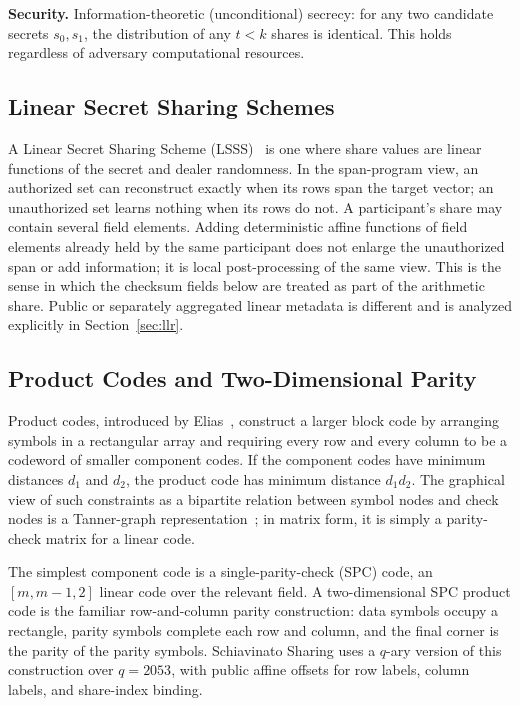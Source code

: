 \documentclass[11pt]{article}
\begin{document}
\textbf{Security.} Information-theoretic (unconditional) secrecy: for any two candidate secrets $s_0, s_1$, the distribution of any $t < k$ shares is identical. This holds regardless of adversary computational resources.

\subsection{Linear Secret Sharing Schemes}

A Linear Secret Sharing Scheme (LSSS)~\cite{beimel2011} is one where share values are linear functions of the secret and dealer randomness. In the span-program view, an authorized set can reconstruct exactly when its rows span the target vector; an unauthorized set learns nothing when its rows do not. A participant's share may contain several field elements. Adding deterministic affine functions of field elements already held by the same participant does not enlarge the unauthorized span or add information; it is local post-processing of the same view. This is the sense in which the checksum fields below are treated as part of the arithmetic share. Public or separately aggregated linear metadata is different and is analyzed explicitly in Section~\ref{sec:llr}.

\subsection{Product Codes and Two-Dimensional Parity}

Product codes, introduced by Elias~\cite{elias1954}, construct a larger block code by arranging symbols in a rectangular array and requiring every row and every column to be a codeword of smaller component codes. If the component codes have minimum distances $d_1$ and $d_2$, the product code has minimum distance $d_1 d_2$. The graphical view of such constraints as a bipartite relation between symbol nodes and check nodes is a Tanner-graph representation~\cite{tanner1981}; in matrix form, it is simply a parity-check matrix for a linear code.

The simplest component code is a single-parity-check (SPC) code, an $[m,m{-}1,2]$ linear code over the relevant field. A two-dimensional SPC product code is the familiar row-and-column parity construction: data symbols occupy a rectangle, parity symbols complete each row and column, and the final corner is the parity of the parity symbols. Schiavinato Sharing uses a $q$-ary version of this construction over $q=2053$, with public affine offsets for row labels, column labels, and share-index binding.
\end{document}
